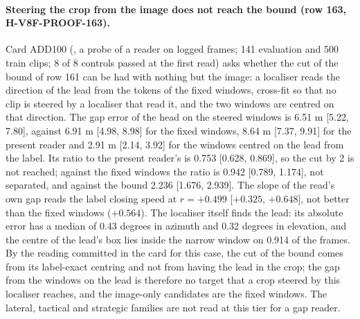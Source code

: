 \paragraph{Steering the crop from the image does not reach the bound (row 163, H-V8F-PROOF-163).} Card ADD100 (, a probe of a reader on logged frames; 141 evaluation and 500 train clips; 8 of 8 controls passed at the first read) asks whether the cut of the bound of row 161 can be had with nothing but the image: a localiser reads the direction of the lead from the tokens of the fixed windows, cross-fit so that no clip is steered by a localiser that read it, and the two windows are centred on that direction. The gap error of the head on the steered windows is 6.51 m [5.22, 7.80], against 6.91 m [4.98, 8.98] for the fixed windows, 8.64 m [7.37, 9.91] for the present reader and 2.91 m [2.14, 3.92] for the windows centred on the lead from the label. Its ratio to the present reader's is 0.753 [0.628, 0.869], so the cut by 2 is not reached; against the fixed windows the ratio is 0.942 [0.789, 1.174], not separated, and against the bound 2.236 [1.676, 2.939]. The slope of the read's own gap reads the label closing speed at $r = +0.499$ [$+0.325$, $+0.648$], not better than the fixed windows ($+0.564$). The localiser itself finds the lead: its absolute error has a median of 0.43 degrees in azimuth and 0.32 degrees in elevation, and the centre of the lead's box lies inside the narrow window on 0.914 of the frames. By the reading committed in the card for this case, the cut of the bound comes from its label-exact centring and not from having the lead in the crop; the gap from the windows on the lead is therefore no target that a crop steered by this localiser reaches, and the image-only candidates are the fixed windows. The lateral, tactical and strategic families are not read at this tier for a gap reader.

